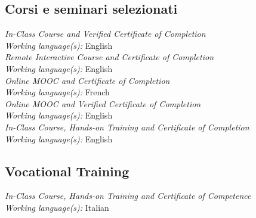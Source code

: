 \documentclass[
  a4paper, 
]{fortysecondscv}
\begin{document}
\subsection{Corsi e seminari selezionati}
\begin{cvtable}
		{{\small\emph{\small In-Class Course and Verified Certificate of Completion}\\\textit{\small Working language(s):} English}\\[-0.8em]}
		{{\small\emph{\small Remote Interactive Course and Certificate of Completion}\\\textit{\small Working language(s):} English}\\[-0.8em]}
		{{\small\emph{\small Online MOOC and Certificate of Completion}\\\textit{\small Working language(s):} French}\\[-0.8em]}
		{{\small\emph{\small Online MOOC and Verified Certificate of Completion}\\\textit{\small Working language(s):} English}\\[-0.8em]}
		{{\small\emph{\small In-Class Course, Hands-on Training and Certificate of Completion}\\\textit{\small Working language(s):} English}}
\end{cvtable}
\subsection{Vocational Training}
\begin{cvtable}
		{{\small\emph{\small In-Class Course, Hands-on Training and Certificate of Competence}\\\textit{\small Working language(s):} Italian}}
\end{cvtable}
\end{document}
